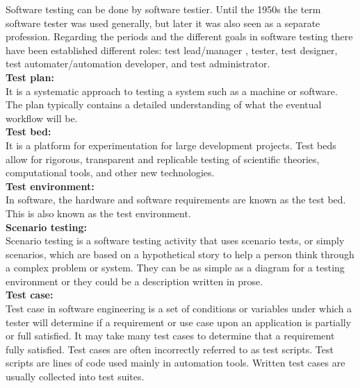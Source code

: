 \hspace*{0.82cm}Software testing can be done by software testier. Until the 1950s the term software tester was used generally, 
but later it was also seen as a separate profession. Regarding the periods and the different goals in software testing there 
have been established different roles: test lead/manager , tester, test designer, test automater/automation developer, and test 
administrator.\\[0.5cm]
\newpage
\textbf{Test plan:}\\
\hspace*{0.82cm}It is a systematic approach to testing a system such as a machine or software. The plan typically contains a detailed 
understanding of what the eventual workflow will be.\\[0.5cm] 
\textbf{Test bed:}\\
\hspace*{0.82cm}It is a platform for experimentation for large development projects. Test beds allow for rigorous, transparent and 
replicable testing of scientific theories, computational tools, and other new technologies.\\[0.5cm]
\textbf{Test environment:}\\
\hspace*{0.82cm}In software, the hardware and software requirements are known as the test bed. This is also known as the test 
environment.\\[0.5cm]
\textbf{Scenario testing:}\\
\hspace*{0.82cm}Scenario testing is a software testing activity that uses scenario tests, or simply scenarios, which are based on 
a hypothetical story to help a person think through a complex problem or system. They can be as simple as a diagram for a testing 
environment or they could be a description written in prose.\\[0.5cm]
\textbf{Test case:}\\
\hspace*{0.82cm}Test case in software engineering is a set of conditions or variables under which a tester will determine if a 
requirement or use case upon an application is partially or full satisfied. It may take many test cases to determine that a 
requirement fully satisfied. Test cases are often incorrectly referred to as test scripts. Test scripts are lines of code used 
mainly in automation tools. Written test cases are usually collected into test suites.\\[0.5cm]
